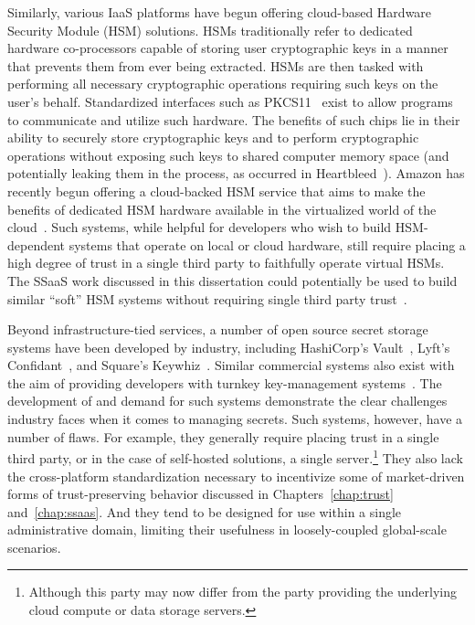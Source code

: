 Similarly, various IaaS platforms have begun offering cloud-based
Hardware Security Module (HSM) solutions. HSMs traditionally refer to
dedicated hardware co-processors capable of storing user cryptographic
keys in a manner that prevents them from ever being extracted. HSMs
are then tasked with performing all necessary cryptographic operations
requiring such keys on the user's behalf. Standardized interfaces such
as PKCS11~\cite{pcks11-standard} exist to allow programs to
communicate and utilize such hardware. The benefits of such chips lie
in their ability to securely store cryptographic keys and to perform
cryptographic operations without exposing such keys to shared computer
memory space (and potentially leaking them in the process, as occurred
in Heartbleed~\cite{heartbleed}). Amazon has recently begun offering a
cloud-backed HSM service that aims to make the benefits of dedicated
HSM hardware available in the virtualized world of the
cloud~\cite{amazon-hsm}. Such systems, while helpful for developers
who wish to build HSM-dependent systems that operate on local or cloud
hardware, still require placing a high degree of trust in a single
third party to faithfully operate virtual HSMs. The SSaaS work
discussed in this dissertation could potentially be used to build
similar ``soft'' HSM systems without requiring single third party
trust~\cite{lorier-pkcs11}.

Beyond infrastructure-tied services, a number of open source secret
storage systems have been developed by industry, including HashiCorp's
Vault~\cite{vault}, Lyft's Confidant~\cite{confidant}, and Square's
Keywhiz~\cite{keywhiz}. Similar commercial systems also exist with the
aim of providing developers with turnkey key-management
systems~\cite{gazzang, porticor, rosen2012}. The development of and
demand for such systems demonstrate the clear challenges industry
faces when it comes to managing secrets. Such systems, however, have a
number of flaws. For example, they generally require placing trust in
a single third party, or in the case of self-hosted solutions, a
single server.\footnote{Although this party may now differ from the
  party providing the underlying cloud compute or data storage
  servers.}  They also lack the cross-platform standardization
necessary to incentivize some of market-driven forms of
trust-preserving behavior discussed in Chapters~\ref{chap:trust}
and~\ref{chap:ssaas}. And they tend to be designed for use within a
single administrative domain, limiting their usefulness in
loosely-coupled global-scale scenarios.


